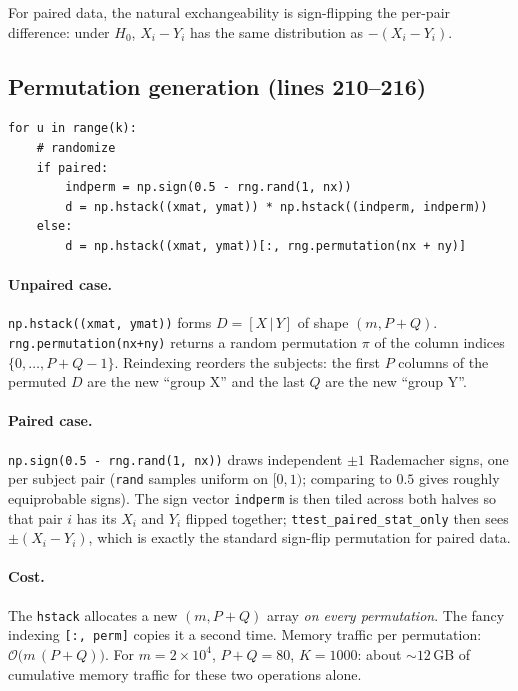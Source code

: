 \documentclass[11pt]{article}
\begin{document}
For paired data, the natural exchangeability is sign-flipping the per-pair difference: under $H_0$, $X_i - Y_i$ has the same distribution as $-(X_i - Y_i)$.

\subsection{Permutation generation (lines 210--216)}

\begin{lstlisting}[firstnumber=210]
for u in range(k):
    # randomize
    if paired:
        indperm = np.sign(0.5 - rng.rand(1, nx))
        d = np.hstack((xmat, ymat)) * np.hstack((indperm, indperm))
    else:
        d = np.hstack((xmat, ymat))[:, rng.permutation(nx + ny)]
\end{lstlisting}

\paragraph{Unpaired case.} \texttt{np.hstack((xmat, ymat))} forms $D = [X\,|\,Y]$ of shape $(m, P+Q)$. \texttt{rng.permutation(nx+ny)} returns a random permutation $\pi$ of the column indices $\{0,\ldots,P+Q-1\}$. Reindexing reorders the subjects: the first $P$ columns of the permuted $D$ are the new ``group X'' and the last $Q$ are the new ``group Y''.

\paragraph{Paired case.} \texttt{np.sign(0.5 - rng.rand(1, nx))} draws independent $\pm 1$ Rademacher signs, one per subject pair (\texttt{rand} samples uniform on $[0,1)$; comparing to $0.5$ gives roughly equiprobable signs). The sign vector \texttt{indperm} is then tiled across both halves so that pair $i$ has its $X_i$ and $Y_i$ flipped together; \texttt{ttest\_paired\_stat\_only} then sees $\pm(X_i - Y_i)$, which is exactly the standard sign-flip permutation for paired data.

\paragraph{Cost.} The \texttt{hstack} allocates a new $(m, P+Q)$ array \emph{on every permutation}. The fancy indexing \texttt{[:, perm]} copies it a second time. Memory traffic per permutation: $\mathcal{O}\bigl(m\,(P+Q)\bigr)$. For $m=2\times 10^4$, $P+Q=80$, $K=1000$: about $\sim 12\,$GB of cumulative memory traffic for these two operations alone.
\end{document}
